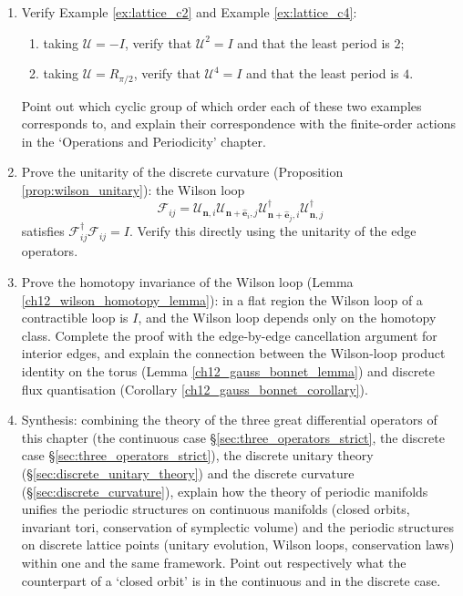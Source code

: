 \begin{enumerate}[leftmargin=3em, label=\textbf{Exercise \arabic*}]
    \item Verify Example \ref{ex:lattice_c2} and Example \ref{ex:lattice_c4}:
    \begin{enumerate}[label=(\roman*)]
        \item taking $\mathcal{U}=-I$, verify that $\mathcal{U}^2=I$ and that the least period is $2$;
        \item taking $\mathcal{U}=R_{\pi/2}$, verify that $\mathcal{U}^4=I$ and that the least period is $4$.
    \end{enumerate}
    Point out which cyclic group of which order each of these two examples corresponds to,
    and explain their correspondence with the finite-order actions in the `Operations and Periodicity' chapter.

    \item Prove the unitarity of the discrete curvature (Proposition \ref{prop:wilson_unitary}):
    the Wilson loop
    \[
    \mathcal{F}_{ij}
    =\mathcal{U}_{\mathbf{n},i}\mathcal{U}_{\mathbf{n}+\hat{\mathbf{e}}_i,j}
    \mathcal{U}_{\mathbf{n}+\hat{\mathbf{e}}_j,i}^\dagger
    \mathcal{U}_{\mathbf{n},j}^\dagger
    \]
    satisfies $\mathcal{F}_{ij}^\dagger\mathcal{F}_{ij}=I$.
    Verify this directly using the unitarity of the edge operators.

    \item Prove the homotopy invariance of the Wilson loop (Lemma \ref{ch12_wilson_homotopy_lemma}):
    in a flat region the Wilson loop of a contractible loop is $I$,
    and the Wilson loop depends only on the homotopy class.
    Complete the proof with the edge-by-edge cancellation argument for interior edges,
    and explain the connection between the Wilson-loop product identity on the torus (Lemma \ref{ch12_gauss_bonnet_lemma})
    and discrete flux quantisation (Corollary \ref{ch12_gauss_bonnet_corollary}).

    \item Synthesis: combining the theory of the three great differential operators of this chapter (the continuous case \S{}\ref{sec:three_operators_strict},
    the discrete case \S{}\ref{sec:three_operators_strict}),
    the discrete unitary theory (\S{}\ref{sec:discrete_unitary_theory})
    and the discrete curvature (\S{}\ref{sec:discrete_curvature}),
    explain how the theory of periodic manifolds unifies the periodic structures on continuous manifolds (closed orbits, invariant tori,
    conservation of symplectic volume) and the periodic structures on discrete lattice points (unitary evolution, Wilson loops,
    conservation laws) within one and the same framework.
    Point out respectively what the counterpart of a `closed orbit' is in the continuous and in the discrete case.
\end{enumerate}
